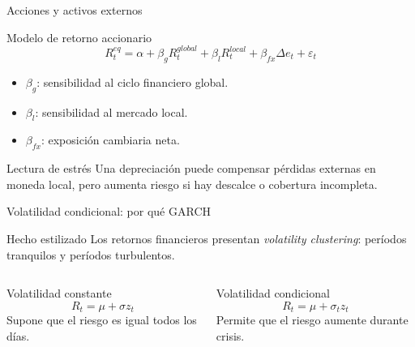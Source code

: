 \documentclass[aspectratio=169,11pt]{beamer}
\begin{document}
\begin{frame}{Acciones y activos externos}
\begin{block}{Modelo de retorno accionario}
\[
R^{eq}_{t}=\alpha+\beta_g R^{global}_{t}+\beta_l R^{local}_{t}+\beta_{fx}\Delta e_t+\varepsilon_t
\]
\end{block}

\begin{itemize}
  \item $\beta_g$: sensibilidad al ciclo financiero global.
  \item $\beta_l$: sensibilidad al mercado local.
  \item $\beta_{fx}$: exposición cambiaria neta.
\end{itemize}

\begin{alertblock}{Lectura de estrés}
Una depreciación puede compensar pérdidas externas en moneda local, pero aumenta riesgo si hay descalce o cobertura incompleta.
\end{alertblock}
\end{frame}

\begin{frame}{Volatilidad condicional: por qué GARCH}
\begin{block}{Hecho estilizado}
Los retornos financieros presentan \textit{volatility clustering}: períodos tranquilos y períodos turbulentos.
\end{block}

\begin{columns}[T]
\begin{block}{Volatilidad constante}
\[
R_t=\mu+\sigma z_t
\]
Supone que el riesgo es igual todos los días.
\end{block}

\begin{alertblock}{Volatilidad condicional}
\[
R_t=\mu+\sigma_t z_t
\]
Permite que el riesgo aumente durante crisis.
\end{alertblock}
\end{columns}
\end{frame}
\end{document}
